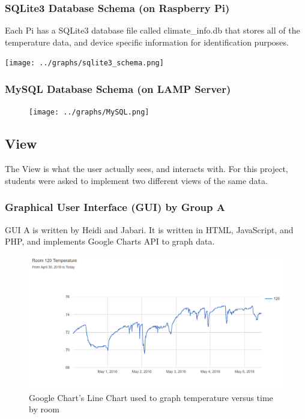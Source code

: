 \documentclass{article}
\begin{document}
			\subsubsection{SQLite3 Database Schema (on Raspberry Pi)}	
				Each Pi has a SQLite3 database file called climate\_info.db that stores all of the temperature data, and device specific information
				for identification purposes.
				
				\begin{center}
					\texttt{[image: ../graphs/sqlite3\_schema.png]}
				\end{center}
			
			\subsubsection{MySQL Database Schema (on LAMP Server)}
				\begin{figure}[H]
					\begin{center}
						\texttt{[image: ../graphs/MySQL.png]}
					\end{center}	
				\end{figure}
			
		\subsection{View}
			The View is what the user actually sees, and interacts with. 
			For this project, students were asked to implement two different views of the same data.		
		
			\subsubsection{Graphical User Interface (GUI) by Group A}
				GUI A is written by Heidi and Jabari. It is written in HTML, JavaScript, and PHP, and implements Google Charts API to graph data.
				
				\begin{figure}[H]
					\begin{center}
						\includegraphics[scale=.4]{TempVersusTime.PNG}			
					\end{center}
					\captionsetup{labelformat=empty}
					\caption{Google Chart's Line Chart used to graph temperature versus time by room}
				\end{figure}				
				
\end{document}
